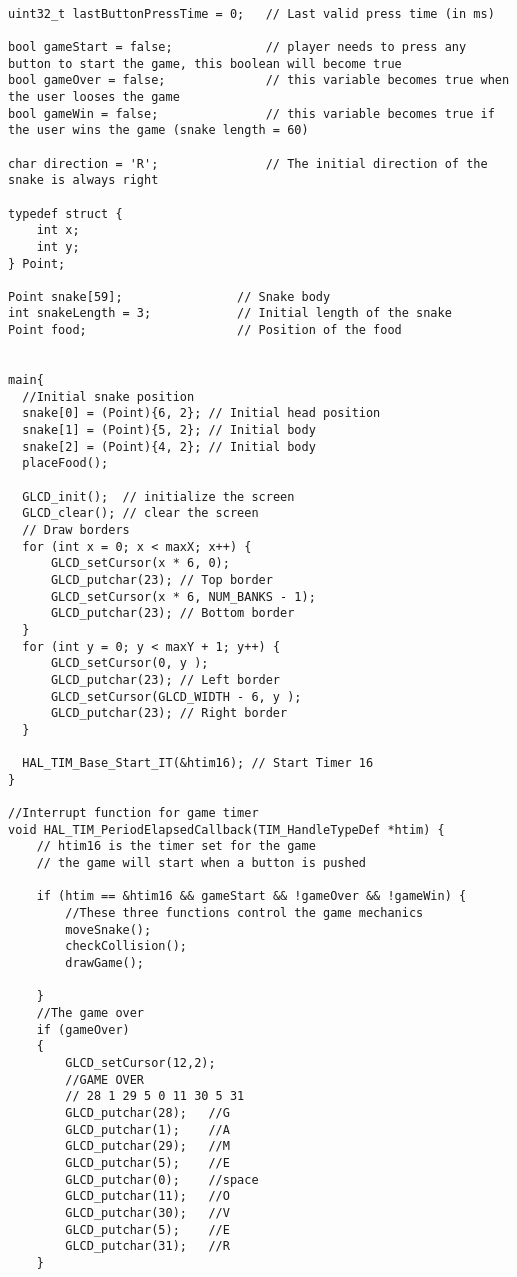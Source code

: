 \begin{lstlisting}[style=CStyle]

uint32_t lastButtonPressTime = 0;   // Last valid press time (in ms)

bool gameStart = false; 			// player needs to press any button to start the game, this boolean will become true
bool gameOver = false;				// this variable becomes true when the user looses the game
bool gameWin = false;				// this variable becomes true if the user wins the game (snake length = 60)

char direction = 'R';				// The initial direction of the snake is always right

typedef struct {
    int x;
    int y;
} Point;

Point snake[59]; 				// Snake body
int snakeLength = 3;           	// Initial length of the snake
Point food;                   	// Position of the food


main{
  //Initial snake position
  snake[0] = (Point){6, 2}; // Initial head position
  snake[1] = (Point){5, 2}; // Initial body
  snake[2] = (Point){4, 2}; // Initial body
  placeFood();

  GLCD_init();  // initialize the screen
  GLCD_clear(); // clear the screen
  // Draw borders
  for (int x = 0; x < maxX; x++) {
      GLCD_setCursor(x * 6, 0);
      GLCD_putchar(23); // Top border
      GLCD_setCursor(x * 6, NUM_BANKS - 1);
      GLCD_putchar(23); // Bottom border
  }
  for (int y = 0; y < maxY + 1; y++) {
      GLCD_setCursor(0, y );
      GLCD_putchar(23); // Left border
      GLCD_setCursor(GLCD_WIDTH - 6, y );
      GLCD_putchar(23); // Right border
  }

  HAL_TIM_Base_Start_IT(&htim16); // Start Timer 16
}

//Interrupt function for game timer
void HAL_TIM_PeriodElapsedCallback(TIM_HandleTypeDef *htim) {
	// htim16 is the timer set for the game
	// the game will start when a button is pushed

    if (htim == &htim16 && gameStart && !gameOver && !gameWin) {
    	//These three functions control the game mechanics
        moveSnake();
        checkCollision();
        drawGame();

	}
    //The game over
    if (gameOver)
    {
    	GLCD_setCursor(12,2);
    	//GAME OVER
    	// 28 1 29 5 0 11 30 5 31
    	GLCD_putchar(28);	//G
    	GLCD_putchar(1);	//A
    	GLCD_putchar(29);	//M
    	GLCD_putchar(5);	//E
    	GLCD_putchar(0);	//space
    	GLCD_putchar(11);	//O
    	GLCD_putchar(30);	//V
    	GLCD_putchar(5);	//E
    	GLCD_putchar(31);	//R
    }


\end{lstlisting}
